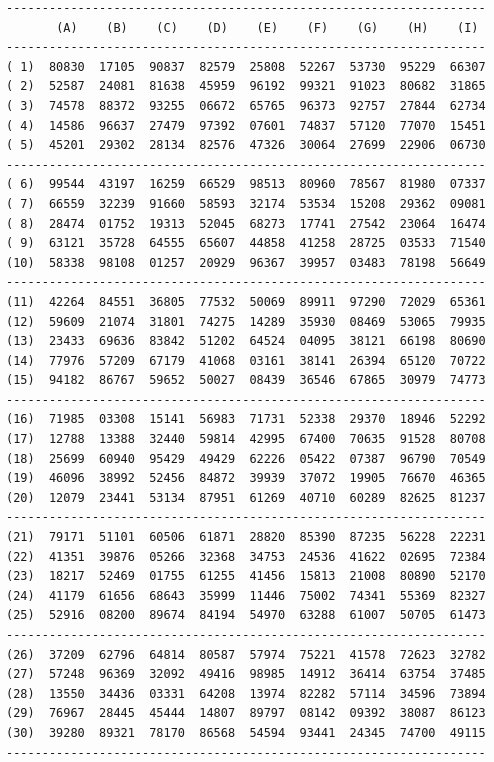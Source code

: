 \begin{verbatim}
-------------------------------------------------------------------
       (A)    (B)    (C)    (D)    (E)    (F)    (G)    (H)    (I)
-------------------------------------------------------------------
( 1)  80830  17105  90837  82579  25808  52267  53730  95229  66307
( 2)  52587  24081  81638  45959  96192  99321  91023  80682  31865
( 3)  74578  88372  93255  06672  65765  96373  92757  27844  62734
( 4)  14586  96637  27479  97392  07601  74837  57120  77070  15451
( 5)  45201  29302  28134  82576  47326  30064  27699  22906  06730
-------------------------------------------------------------------
( 6)  99544  43197  16259  66529  98513  80960  78567  81980  07337
( 7)  66559  32239  91660  58593  32174  53534  15208  29362  09081
( 8)  28474  01752  19313  52045  68273  17741  27542  23064  16474
( 9)  63121  35728  64555  65607  44858  41258  28725  03533  71540
(10)  58338  98108  01257  20929  96367  39957  03483  78198  56649
-------------------------------------------------------------------
(11)  42264  84551  36805  77532  50069  89911  97290  72029  65361
(12)  59609  21074  31801  74275  14289  35930  08469  53065  79935
(13)  23433  69636  83842  51202  64524  04095  38121  66198  80690
(14)  77976  57209  67179  41068  03161  38141  26394  65120  70722
(15)  94182  86767  59652  50027  08439  36546  67865  30979  74773
-------------------------------------------------------------------
(16)  71985  03308  15141  56983  71731  52338  29370  18946  52292
(17)  12788  13388  32440  59814  42995  67400  70635  91528  80708
(18)  25699  60940  95429  49429  62226  05422  07387  96790  70549
(19)  46096  38992  52456  84872  39939  37072  19905  76670  46365
(20)  12079  23441  53134  87951  61269  40710  60289  82625  81237
-------------------------------------------------------------------
(21)  79171  51101  60506  61871  28820  85390  87235  56228  22231
(22)  41351  39876  05266  32368  34753  24536  41622  02695  72384
(23)  18217  52469  01755  61255  41456  15813  21008  80890  52170
(24)  41179  61656  68643  35999  11446  75002  74341  55369  82327
(25)  52916  08200  89674  84194  54970  63288  61007  50705  61473
-------------------------------------------------------------------
(26)  37209  62796  64814  80587  57974  75221  41578  72623  32782
(27)  57248  96369  32092  49416  98985  14912  36414  63754  37485
(28)  13550  34436  03331  64208  13974  82282  57114  34596  73894
(29)  76967  28445  45444  14807  89797  08142  09392  38087  86123
(30)  39280  89321  78170  86568  54594  93441  24345  74700  49115
-------------------------------------------------------------------



\end{verbatim}
